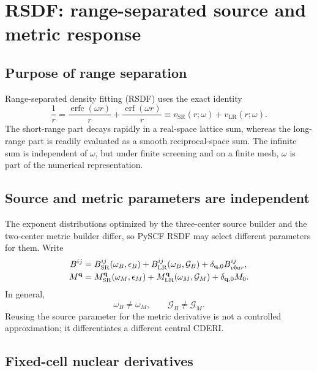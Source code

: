 \section{RSDF: range-separated source and metric response}
\label{sec:rsdf}

\subsection{Purpose of range separation}

Range-separated density fitting (RSDF) uses the exact identity
\begin{equation}
  \frac1r
  =\frac{\operatorname{erfc}(\omega r)}{r}
   +\frac{\operatorname{erf}(\omega r)}{r}
  \equiv v_{\mathrm{SR}}(r;\omega)+v_{\mathrm{LR}}(r;\omega).
  \label{eq:rsdf-range-separation}
\end{equation}
The short-range part decays rapidly in a real-space lattice sum, whereas the
long-range part is readily evaluated as a smooth reciprocal-space sum.  The
infinite sum is independent of $\omega$, but under finite screening and on a
finite mesh, $\omega$ is part of the numerical representation.

\subsection{Source and metric parameters are independent}

The exponent distributions optimized by the three-center source builder and
the two-center metric builder differ, so PySCF RSDF may select different
parameters for them.  Write
\begin{align}
  B^{ij}
  &=B_{\mathrm{SR}}^{ij}(\omega_B,\epsilon_B)
    +B_{\mathrm{LR}}^{ij}(\omega_B,\mathcal G_B)
    +\delta_{\mathbf{q},0}B_{vbar}^{ij},
  \label{eq:rsdf-source-split}\\
  M^{\mathbf{q}}
  &=M_{\mathrm{SR}}^{\mathbf{q}}(\omega_M,\epsilon_M)
    +M_{\mathrm{LR}}^{\mathbf{q}}(\omega_M,\mathcal G_M)
    +\delta_{\mathbf{q},0}M_0.
  \label{eq:rsdf-metric-split}
\end{align}
In general,
\begin{equation}
  \omega_B\ne\omega_M,
  \qquad \mathcal G_B\ne\mathcal G_M.
  \label{eq:rsdf-independent-parameters}
\end{equation}
Reusing the source parameter for the metric derivative is not a controlled
approximation; it differentiates a different central CDERI.

\subsection{Fixed-cell nuclear derivatives}

